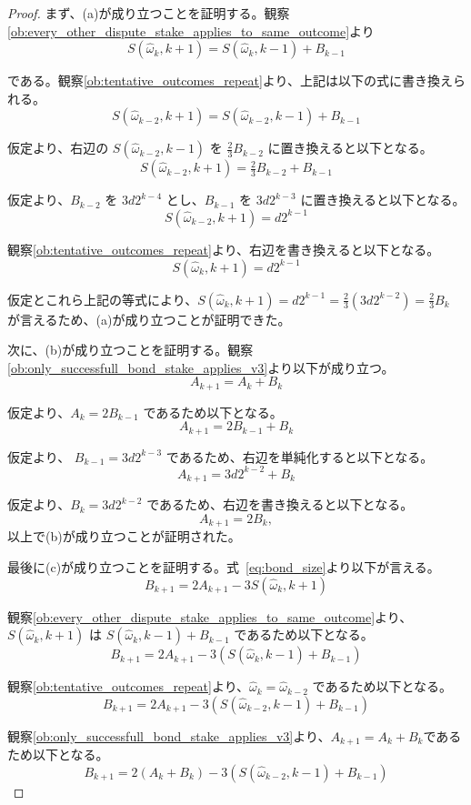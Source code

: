 \documentclass[floatfix,reprint,nofootinbib,amsmath,amssymb,epsfig,pre,floats,letterpaper,groupedaffiliation]{revtex4-1}
\theoremstyle{definition}
\theoremstyle{definition}
\theoremstyle{definition}
\begin{document}
\begin{appendix}
\begin{proof}
まず、(a)が成り立つことを証明する。観察\ref{ob:every_other_dispute_stake_applies_to_same_outcome}より
\[ S(\hat{\omega}_{k},k+1)=S(\hat{\omega}_{k},k-1)+B_{k-1} \]

である。観察\ref{ob:tentative_outcomes_repeat}より、上記は以下の式に書き換えられる。
\[ S(\hat{\omega}_{k-2},k+1)=S(\hat{\omega}_{k-2},k-1)+B_{k-1} \]

仮定より、右辺の $S(\hat{\omega}_{k-2},k-1)$ を $\frac{2}{3}B_{k-2}$ に置き換えると以下となる。
\[ S(\hat{\omega}_{k-2},k+1)=\tfrac{2}{3}B_{k-2}+B_{k-1} \]

仮定より、$B_{k-2}$ を $3d2^{k-4}$ とし、$B_{k-1}$ を $3d2^{k-3}$ に置き換えると以下となる。
\[ S(\hat{\omega}_{k-2},k+1)=d2^{k-1} \]

観察\ref{ob:tentative_outcomes_repeat}より、右辺を書き換えると以下となる。
\[ S(\hat{\omega}_{k},k+1)=d2^{k-1} \]

仮定とこれら上記の等式により、$S(\hat{\omega}_{k},k+1)=d2^{k-1}=\frac{2}{3}(3d2^{k-2})=\frac{2}{3}B_{k}$ が言えるため、(a)が成り立つことが証明できた。

次に、(b)が成り立つことを証明する。観察\ref{ob:only_successfull_bond_stake_applies_v3}より以下が成り立つ。
\[ A_{k+1}=A_{k}+B_{k} \]

仮定より、$A_{k}=2B_{k-1}$ であるため以下となる。
\[ A_{k+1}=2B_{k-1}+B_{k} \]

仮定より、 $B_{k-1}=3d2^{k-3}$ であるため、右辺を単純化すると以下となる。
\[ A_{k+1}=3d2^{k-2}+B_k \]

仮定より、$B_{k}=3d2^{k-2}$ であるため、右辺を書き換えると以下となる。
\[ A_{k+1}=2B_{k}, \]
以上で(b)が成り立つことが証明された。

最後に(c)が成り立つことを証明する。式~\ref{eq:bond_size}より以下が言える。
\[ B_{k+1}=2A_{k+1}-3S(\hat{\omega}_{k},k+1) \]

観察\ref{ob:every_other_dispute_stake_applies_to_same_outcome}より、$S(\hat{\omega}_{k},k+1)$ は $S(\hat{\omega}_{k},k-1)+B_{k-1}$ であるため以下となる。
\[ B_{k+1}=2A_{k+1}-3\left(S(\hat{\omega}_{k},k-1)+B_{k-1}\right) \]

観察\ref{ob:tentative_outcomes_repeat}より、$\hat{\omega}_{k}=\hat{\omega}_{k-2}$ であるため以下となる。
\[ B_{k+1}=2A_{k+1}-3\left(S(\hat{\omega}_{k-2},k-1)+B_{k-1}\right) \]

観察\ref{ob:only_successfull_bond_stake_applies_v3}より、$A_{k+1}=A_{k}+B_{k}$であるため以下となる。
\[ B_{k+1}=2\left(A_{k}+B_{k}\right)-3\left(S(\hat{\omega}_{k-2},k-1)+B_{k-1}\right) \]


\end{proof}
\end{appendix}
\end{document}
